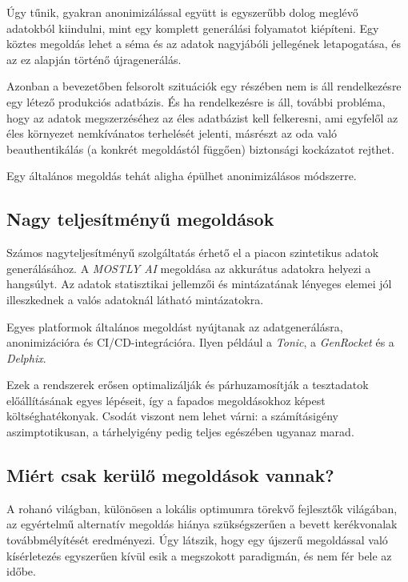 \documentclass[
    parspace,
    noindent,
    nohyp,
]{elteiktdk}[2023/04/10]
\newcommand{\todoref}[1]{\todo[inline, noinlinepar, color=red, textcolor=white, inlinewidth=0.6cm, caption={#1}]{\large \textbf{×}}}
\begin{document}
Úgy tűnik, gyakran anonimizálással együtt is egyszerűbb dolog meglévő adatokból kiindulni,
mint egy komplett generálási folyamatot kiépíteni.
Egy köztes megoldás lehet a séma és az adatok nagyjábóli jellegének letapogatása,
és az ez alapján történő újragenerálás.

Azonban a bevezetőben felsorolt szituációk egy részében
nem is áll rendelkezésre egy létező produkciós adatbázis.
És ha rendelkezésre is áll, további probléma,
hogy az adatok megszerzéséhez az éles adatbázist kell felkeresni,
ami egyfelől az éles környezet nemkívánatos terhelését jelenti,
másrészt az oda való beauthentikálás (a konkrét megoldástól függően) biztonsági kockázatot rejthet.

Egy általános megoldás tehát aligha épülhet anonimizálásos módszerre.

\subsection{Nagy teljesítményű megoldások}

Számos nagyteljesítményű szolgáltatás érhető el a piacon szintetikus adatok generálásához.
A \textit{MOSTLY AI} megoldása az akkurátus adatokra helyezi a hangsúlyt.
Az adatok statisztikai jellemzői és mintázatának lényeges elemei
jól illeszkednek a valós adatoknál látható mintázatokra. \todoref{+CITE: Nagy teljesítményű megoldás: MOSTLY AI}

Egyes platformok általános megoldást nyújtanak az adatgenerálásra, anonimizációra és CI/CD-integrációra.
Ilyen például a \textit{Tonic}, a \textit{GenRocket} és a \textit{Delphix}. \todoref{+CITE: További nagy teljesítményű megoldások: Tonic, GenRocket, Delphix}

Ezek a rendszerek erősen optimalizálják és párhuzamosítják a tesztadatok előállításának egyes lépéseit,
így a fapados megoldásokhoz képest költséghatékonyak.
Csodát viszont nem lehet várni: a számításigény aszimptotikusan,
a tárhelyigény pedig teljes egészében ugyanaz marad.

\subsection{Miért csak kerülő megoldások vannak?}

A rohanó világban, különösen a lokális optimumra törekvő fejlesztők világában,
az egyértelmű alternatív megoldás hiánya szükségszerűen
a bevett kerékvonalak továbbmélyítését eredményezi.
Úgy látszik, hogy egy újszerű megoldással való kísérletezés egyszerűen
kívül esik a megszokott paradigmán, és nem fér bele az időbe.
\end{document}
